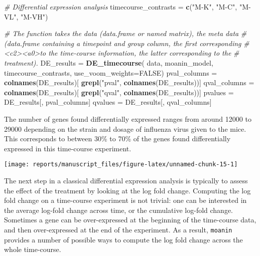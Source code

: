 \documentclass[9pt,a4paper,]{extarticle}
\newenvironment{Shaded}{\begin{snugshade}}{\end{snugshade}}
\newcommand{\CommentTok}[1]{\textcolor[rgb]{0.56,0.35,0.01}{\textit{#1}}}
\newcommand{\DataTypeTok}[1]{\textcolor[rgb]{0.13,0.29,0.53}{#1}}
\newcommand{\KeywordTok}[1]{\textcolor[rgb]{0.13,0.29,0.53}{\textbf{#1}}}
\newcommand{\NormalTok}[1]{#1}
\newcommand{\OtherTok}[1]{\textcolor[rgb]{0.56,0.35,0.01}{#1}}
\newcommand{\StringTok}[1]{\textcolor[rgb]{0.31,0.60,0.02}{#1}}
\begin{document}
\begin{Shaded}
\begin{Highlighting}[]
\CommentTok{# Differential expression analysis}
\NormalTok{timecourse_contrasts =}\StringTok{ }\KeywordTok{c}\NormalTok{(}\StringTok{"M-K"}\NormalTok{, }\StringTok{"M-C"}\NormalTok{, }\StringTok{"M-VL"}\NormalTok{, }\StringTok{"M-VH"}\NormalTok{)}

\CommentTok{# The function takes the data (data.frame or named matrix), the meta data}
\CommentTok{# (data.frame containing a timepoint and group column, the first corresponding}
\CommentTok{#<c2><a0>to the time-course information, the latter corresponding to the}
\CommentTok{# treatment).}
\NormalTok{DE_results =}\StringTok{ }\KeywordTok{DE_timecourse}\NormalTok{(}
\NormalTok{    data, moanin_model, timecourse_contrasts,}
    \DataTypeTok{use_voom_weights=}\OtherTok{FALSE}\NormalTok{)}
\NormalTok{pval_columns =}\StringTok{ }\KeywordTok{colnames}\NormalTok{(DE_results)[}
    \KeywordTok{grepl}\NormalTok{(}\StringTok{"pval"}\NormalTok{, }\KeywordTok{colnames}\NormalTok{(DE_results))]}
\NormalTok{qval_columns =}\StringTok{ }\KeywordTok{colnames}\NormalTok{(DE_results)[}
    \KeywordTok{grepl}\NormalTok{(}\StringTok{"qval"}\NormalTok{, }\KeywordTok{colnames}\NormalTok{(DE_results))]}
\NormalTok{pvalues =}\StringTok{ }\NormalTok{DE_results[, pval_columns]}
\NormalTok{qvalues =}\StringTok{ }\NormalTok{DE_results[, qval_columns]}
\end{Highlighting}
\end{Shaded}

The number of genes found differentially expressed ranges from around 12000 to
29000 depending on the strain and dosage of influenza virus given to the mice.
This corresponds to between 30\% to 70\% of the genes found differentially
expressed in this time-course experiment.

\begin{center}\texttt{[image: reports/manuscript\_files/figure-latex/unnamed-chunk-15-1]} \end{center}

The next step in a classical differential expression analysis is typically to
assess the effect of the treatment by looking at the log fold change.
Computing the log fold change on a time-course experiment is not trivial: one
can be interested in the average log-fold change across time, or the
cumulative log-fold change. Sometimes a gene can be over-expressed at the
beginning of the time-course data, and then over-expressed at the end of the
experiment. As a result, \texttt{moanin} provides a number of possible ways to
compute the log fold change across the whole time-course.
\end{document}
